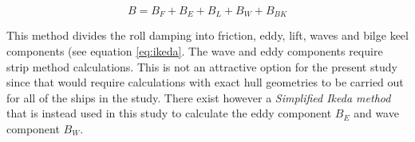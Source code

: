\begin{equation} \label{eq:ikeda}
B = B_F + B_E + B_L + B_W + B_{BK}
\end{equation}

This method divides the roll damping into friction, eddy, lift, waves and bilge keel components (see equation \ref{eq:ikeda}. The wave and eddy components require strip method calculations. This is not an attractive option for the present study since that would require calculations with exact hull geometries to be carried out for all of the ships in the study. There exist however a \emph{Simplified Ikeda method} \cite{kawahara_simple_2011} that is instead used in this study to calculate the eddy component $B_E$ and wave component $B_W$.




